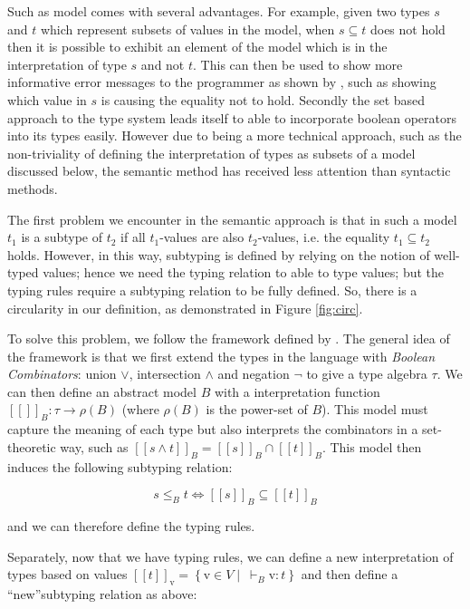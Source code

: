 \documentclass{l4proj}
\begin{document}
Such as model comes with several advantages.
For example, given two types $s$ and $t$ which represent subsets of values in the model, when $s \subseteq t$ does not hold then it is possible to exhibit an element of the model which is in the interpretation of type $s$ and not $t$.
This can then be used to show more informative error messages to the programmer as shown by \citet{Castagna2005}, such as showing which value in $s$ is causing the equality not to hold.
Secondly the set based approach to the type system leads itself to able to incorporate boolean operators into its types easily.
However due to being a more technical approach, such as the non-triviality of defining the interpretation of types as subsets of a model discussed below, the semantic method has received less attention than syntactic methods.

The first problem we encounter in the semantic approach is that in such a model $t_{1}$ is a subtype of $t_{2}$ if all $t_{1}$-values are also $t_{2}$-values, i.e. the equality $t_{1} \subseteq t_{2}$ holds.
However, in this way, subtyping is defined by relying on the notion of well-typed values; hence we need the typing relation to able to type values; but the typing rules require a subtyping relation to be fully defined.
So, there is a circularity in our definition, as demonstrated in Figure \ref{fig:circ}.

To solve this problem, we follow the framework defined by \citet{Frisch2008}.
The general idea of the framework is that we first extend the types in the language with \emph{Boolean Combinators}: union $\lor$, intersection $\land$ and negation $\neg$ to give a type algebra $\tau$.
We can then define an abstract model $B$ with a interpretation function $[\![ ]\!]_{B} : \tau \to \rho(B)$ (where $\rho(B)$ is the power-set of $B$).
This model must capture the meaning of each type but also interprets the combinators in a set-theoretic way, such as $[\![s \land t]\!]_{B} = [\![s]\!]_{B} \cap [\![t]\!]_{B}$.
This model then induces the following subtyping relation:

\begin{equation}
    s \leq_{B} t \iff [\![s]\!]_{B} \subseteq [\![t]\!]_{B}
\end{equation}

and we can therefore define the typing rules.

Separately, now that we have typing rules, we can define a new interpretation of types based on values $[\![t]\!]_{\mathrm{v}} = \left\{\mathrm{v} \in V \mid \: \vdash_{B} \mathrm{v} : t \right\}$ and then define a ``new''subtyping relation as above:
\end{document}
